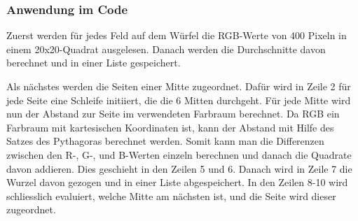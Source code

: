 \documentclass[a4paper, 12pt]{article}
\begin{document}
\subsubsection{Anwendung im Code}
Zuerst werden für jedes Feld auf dem Würfel die RGB-Werte von 400 Pixeln in einem 20x20-Quadrat ausgelesen. Danach werden die Durchschnitte davon berechnet und in einer Liste gespeichert.

Als nächstes werden die Seiten einer Mitte zugeordnet. Dafür wird in Zeile 2 für jede Seite eine Schleife initiiert, die die 6 Mitten durchgeht. Für jede Mitte wird nun der Abstand zur Seite im verwendeten Farbraum berechnet. Da RGB ein Farbraum mit kartesischen Koordinaten ist, kann der Abstand mit Hilfe des Satzes des Pythagoras berechnet werden. Somit kann man die Differenzen zwischen den R-, G-, und B-Werten einzeln berechnen und danach die Quadrate davon addieren. Dies geschieht in den Zeilen 5 und 6. Danach wird in Zeile 7 die Wurzel davon gezogen und in einer Liste abgespeichert. In den Zeilen 8-10 wird schliesslich evaluiert, welche Mitte am nächsten ist, und die Seite wird dieser zugeordnet. 

\end{document}
